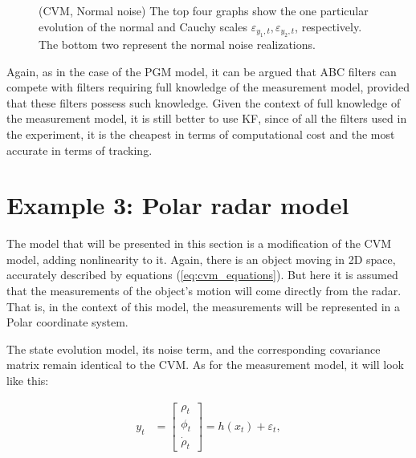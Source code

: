 \begin{figure}[!ht]
\centering
\caption{(CVM, Normal noise) The top four graphs show the one particular evolution of the normal and Cauchy scales \(\varepsilon_{y_1,t}, \varepsilon_{y_2,t}\), respectively. The bottom two represent the normal noise realizations.}
\label{fig:cvm_abc_scales_evolution_normal}
\end{figure}

Again, as in the case of the PGM model, it can be argued that ABC filters can compete with filters requiring full knowledge of the measurement model, provided that these filters possess such knowledge. Given the context of full knowledge of the measurement model, it is still better to use KF, since of all the filters used in the experiment, it is the cheapest in terms of computational cost and the most accurate in terms of tracking.

\section{Example 3: Polar radar model}
The model that will be presented in this section is a modification of the CVM model, adding nonlinearity to it. Again, there is an object moving in 2D space, accurately described by equations (\ref{eq:cvm_equations}). But here it is assumed that the measurements of the object's motion will come directly from the radar. That is, in the context of this model, the measurements will be represented in a Polar coordinate system. 

The state evolution model, its noise term, and the corresponding covariance matrix remain identical to the CVM. As for the measurement model, it will look like this:

\begin{equation}
    \begin{aligned}
     y_t &=
    \begin{bmatrix}
        \rho_t \\ 
        \phi_t \\ 
        \dot{\rho}_t
    \end{bmatrix}
    = h(x_{t}) + \varepsilon_t,
    \end{aligned}
    \label{eq:prm_equations}
\end{equation}

